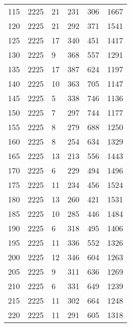 \begin{longtable}{|l|l|l|l|l|l|}
115& 2225 & 21  & 231  & 306  & 1667\\
120& 2225 & 21  & 292  & 371  & 1541\\
125& 2225 & 17  & 340  & 451  & 1417\\
130& 2225 & 9   & 368  & 557  & 1291\\
135& 2225 & 17  & 387  & 624  & 1197\\
140& 2225 & 10  & 363  & 705  & 1147\\
145& 2225 & 5   & 338  & 746  & 1136\\
150& 2225 & 7   & 297  & 744  & 1177\\
155& 2225 & 8   & 279  & 688  & 1250\\
160& 2225 & 8   & 254  & 634  & 1329\\
165& 2225 & 13  & 213  & 556  & 1443\\
170& 2225 & 6   & 229  & 494  & 1496\\
175& 2225 & 11  & 234  & 456  & 1524\\
180& 2225 & 13  & 260  & 421  & 1531\\
185& 2225 & 10  & 285  & 446  & 1484\\
190& 2225 & 6   & 318  & 495  & 1406\\
195& 2225 & 11  & 336  & 552  & 1326\\
200& 2225 & 12  & 346  & 604  & 1263\\
205& 2225 & 9   & 311  & 636  & 1269\\
210& 2225 & 6   & 331  & 649  & 1239\\
215& 2225 & 11  & 302  & 664  & 1248\\
220& 2225 & 11  & 291  & 605  & 1318\\
	\bottomrule
\end{longtable}